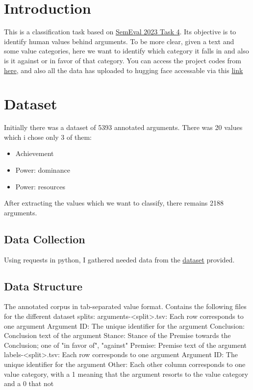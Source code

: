 
\section{Introduction}
This is a classification task based on \href{https://valueeval.webis.de/}{SemEval 2023 Task 4}. Its objective is to identify human values behind arguments.  
To be more clear, given a text and some value categories, here we want to identify which category it falls in and also is it against or in favor of that category.  
You can access the project codes from \href{https://github.com/ShahrzadAzari/Human_Value_Detection}{here},
and also all the data has uploaded to hugging face accessable via this \href{https://huggingface.co/datasets/Sheza/Human-Values}{link}

\section{Dataset}
Initially there was a dataset of 5393 annotated arguments. There was 20 values which i chose only 3 of them:
\begin{itemize}
	\item Achievement
	\item Power: dominance
	\item Power: resources
\end{itemize}
After extracting the values which we want to classify, there remains 2188 arguments.

\subsection{Data Collection}
Using requests in python, I gathered needed data from the \href{https://zenodo.org/record/7879430/files}{dataset} provided.

\subsection{Data Structure}
The annotated corpus in tab-separated value format. Contains the following files for the different dataset splits:
    arguments-<split>.tsv: Each row corresponds to one argument
        Argument ID: The unique identifier for the argument
        Conclusion: Conclusion text of the argument
        Stance: Stance of the Premise towards the Conclusion; one of "in favor of", "against"
        Premise: Premise text of the argument
    labels-<split>.tsv: Each row corresponds to one argument
        Argument ID: The unique identifier for the argument
        Other: Each other column corresponds to one value category, with a 1 meaning that the argument resorts to the value category and a 0 that not

